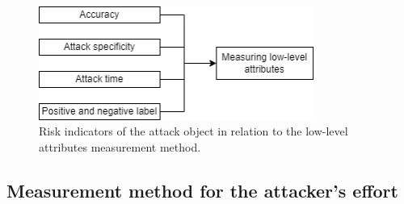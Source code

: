 \begin{figure}[ht!]
  \centering
  \includegraphics[width=9cm]{pictures/measure_damage.png}
  \caption{Risk indicators of the attack object in relation to the low-level attributes measurement method.}
  \label{fig:measure_damage}
\end{figure}

\subsection{Measurement method for the attacker's effort}
\label{sec:find_effort}

